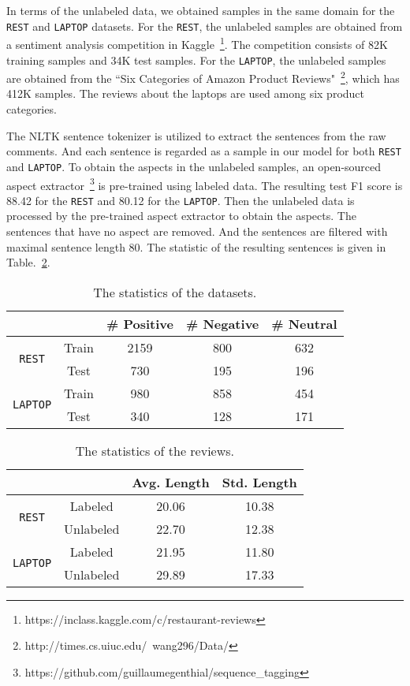 \documentclass[11pt,a4paper]{article}
\begin{document}
In terms of the unlabeled data, we obtained samples in the same domain for the \texttt{REST} and \texttt{LAPTOP} datasets.
For the \texttt{REST}, the unlabeled samples are obtained from a sentiment analysis competition in Kaggle~\footnote{https://inclass.kaggle.com/c/restaurant-reviews}.
The competition consists of 82K training samples and 34K test samples.
For the \texttt{LAPTOP}, the unlabeled samples are obtained from the ``Six Categories of Amazon Product Reviews"~\footnote{http://times.cs.uiuc.edu/~wang296/Data/}, which has 412K samples.
The reviews about the laptops are used among six product categories.

The NLTK sentence tokenizer is utilized to extract the sentences from the raw comments.
And each sentence is regarded as a sample in our model for both \texttt{REST} and \texttt{LAPTOP}.
To obtain the aspects in the unlabeled samples, an open-sourced aspect extractor~\footnote{https://github.com/guillaumegenthial/sequence\_tagging} is pre-trained using labeled data.
The resulting test F1 score is 88.42 for the \texttt{REST} and 80.12 for the \texttt{LAPTOP}.
Then the unlabeled data is processed by the pre-trained aspect extractor to obtain the aspects.
The sentences that have no aspect are removed.
And the sentences are filtered with maximal sentence length 80.
The  statistic of the resulting sentences is given in Table.~\ref{tab:ssta}.



\begin{table}
	\small
	\begin{tabular}{c c c c c}
		\toprule
&   & \# Positive & \# Negative & \# Neutral \\
		\hline
		\multirow{ 2}{*}{ \texttt{REST}} & Train & 2159 & 800 & 632 \\
		& Test & 730 & 195 & 196   \\
		\hline
		\multirow{ 2}{*}{ \texttt{LAPTOP}} & Train & 980 & 858 & 454 \\
		& Test & 340 & 128 & 171   \\
		\toprule
	\end{tabular}
	\caption{The statistics of the datasets.}
	\label{tab:sta}
\end{table}

\begin{table}
	\small
	\centering
	\begin{tabular}{c c c c}
		\toprule
&   & Avg. Length &  Std. Length  \\
		\hline
		\multirow{ 2}{*}{ \texttt{REST}} & Labeled & 20.06 & 10.38  \\
		& Unlabeled & 22.70 & 12.38   \\
		\hline
		\multirow{ 2}{*}{ \texttt{LAPTOP}} & Labeled & 21.95 & 11.80  \\
		& Unlabeled & 29.89 & 17.33   \\
		\toprule
	\end{tabular}
	\caption{The statistics of the reviews.}
	\label{tab:ssta}
\end{table}
\end{document}
